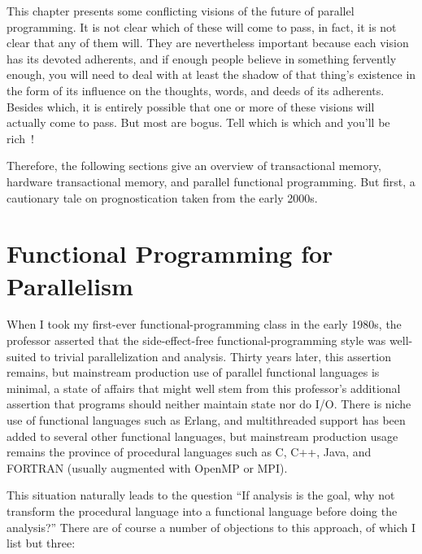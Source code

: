 

This chapter presents some conflicting visions of the future of parallel
programming.
It is not clear which of these will come to pass, in fact, it is not
clear that any of them will.
They are nevertheless important because each vision has its devoted
adherents, and if enough people believe in something fervently enough,
you will need to deal with at least the shadow of that thing's existence
in the form of its
influence on the thoughts, words, and deeds of its adherents.
Besides which, it is entirely possible that one or more of these visions
will actually come to pass.
But most are bogus.
Tell which is which and you'll be rich~\cite{KeithRSpitz1977}!

Therefore, the following sections give an overview of transactional
memory, hardware transactional memory, and
parallel functional programming.
But first, a cautionary tale on prognostication taken from the early 2000s.





\section{Functional Programming for Parallelism}
\label{sec:future:Functional Programming for Parallelism}

When I took my first-ever functional-programming class in the early 1980s,
the professor asserted that the side-effect-free functional-programming
style was well-suited to trivial parallelization and analysis.
Thirty years later, this assertion remains, but mainstream production
use of parallel functional languages is minimal, a state of affairs
that might well stem from this professor's additional assertion that
programs should neither maintain state nor do I/O.
There is niche use of functional languages such as Erlang, and
multithreaded support has been added to several other functional languages,
but mainstream production usage remains the province of procedural
languages such as C, C++, Java, and FORTRAN (usually augmented with
OpenMP or MPI).

This situation naturally leads to the question ``If analysis is the goal,
why not transform the procedural language into a functional language before
doing the analysis?''
There are of course a number of objections to this approach, of which
I list but three:

